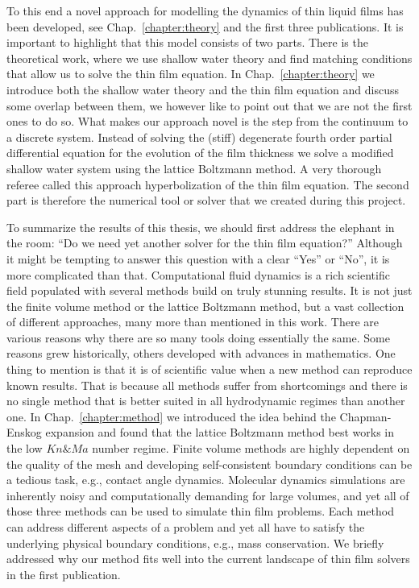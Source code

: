 To this end a novel approach for modelling the dynamics of thin liquid films has been developed, see Chap.~\ref{chapter:theory} and the first three publications.
It is important to highlight that this model consists of two parts. 
There is the theoretical work, where we use shallow water theory and find matching conditions that allow us to solve the thin film equation. 
In Chap.~\ref{chapter:theory} we introduce both the shallow water theory and the thin film equation and discuss some overlap between them, we however like to point out that we are not the first ones to do so.  
What makes our approach novel is the step from the continuum to a discrete system. 
Instead of solving the (stiff) degenerate fourth order partial differential equation for the evolution of the film thickness we solve a modified shallow water system using the lattice Boltzmann method.
A very thorough referee called this approach hyperbolization of the thin film equation.
The second part is therefore the numerical tool or solver that we created during this project.  

To summarize the results of this thesis, we should first address the elephant in the room: ``Do we need yet another solver for the thin film equation?''
Although it might be tempting to answer this question with a clear ``Yes'' or ``No'', it is more complicated than that.
Computational fluid dynamics is a rich scientific field populated with several methods build on truly stunning results.
It is not just the finite volume method or the lattice Boltzmann method, but a vast collection of different approaches, many more than mentioned in this work.
There are various reasons why there are so many tools doing essentially the same. 
Some reasons grew historically, others developed with advances in mathematics.
One thing to mention is that it is of scientific value when a new method can reproduce known results.
That is because all methods suffer from shortcomings and there is no single method that is better suited in all hydrodynamic regimes than another one.
In Chap.~\ref{chapter:method} we introduced the idea behind the Chapman-Enskog expansion and found that the lattice Boltzmann method best works in the low $Kn \& Ma$ number regime.
Finite volume methods are highly dependent on the quality of the mesh and developing self-consistent boundary conditions can be a tedious task, e.g., contact angle dynamics.
Molecular dynamics simulations are inherently noisy and computationally demanding for large volumes, and yet all of those three methods can be used to simulate thin film problems.
Each method can address different aspects of a problem and yet all have to satisfy the underlying physical boundary conditions, e.g., mass conservation.
We briefly addressed why our method fits well into the current landscape of thin film solvers in the first publication.

